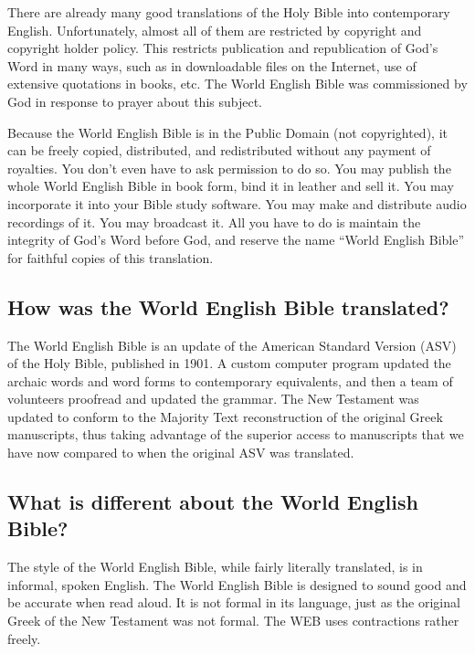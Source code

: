 There are already many good translations of the Holy Bible into
contemporary English. Unfortunately, almost all of them are restricted
by copyright and copyright holder policy. This restricts publication and
republication of God's Word in many ways, such as in downloadable files
on the Internet, use of extensive quotations in books, etc. The World
English Bible was commissioned by God in response to prayer about this
subject.

Because the World English Bible is in the Public Domain (not
copyrighted), it can be freely copied, distributed, and redistributed
without any payment of royalties. You don't even have to ask permission
to do so. You may publish the whole World English Bible in book form,
bind it in leather and sell it. You may incorporate it into your Bible
study software. You may make and distribute audio recordings of it. You
may broadcast it. All you have to do is maintain the integrity of God's
Word before God, and reserve the name ``World English Bible'' for
faithful copies of this translation.

\hypertarget{how-was-the-world-english-bible-translated}{%
\subsection{How was the World English Bible
translated?}\label{how-was-the-world-english-bible-translated}}

The World English Bible is an update of the American Standard Version
(ASV) of the Holy Bible, published in 1901. A custom computer program
updated the archaic words and word forms to contemporary equivalents,
and then a team of volunteers proofread and updated the grammar. The New
Testament was updated to conform to the Majority Text reconstruction of
the original Greek manuscripts, thus taking advantage of the superior
access to manuscripts that we have now compared to when the original ASV
was translated.

\hypertarget{what-is-different-about-the-world-english-bible}{%
\subsection{What is different about the World English
Bible?}\label{what-is-different-about-the-world-english-bible}}

The style of the World English Bible, while fairly literally translated,
is in informal, spoken English. The World English Bible is designed to
sound good and be accurate when read aloud. It is not formal in its
language, just as the original Greek of the New Testament was not
formal. The WEB uses contractions rather freely.

